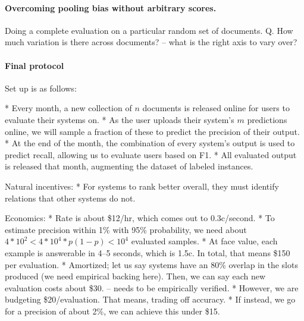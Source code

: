 \paragraph{Overcoming pooling bias without arbitrary scores.}

Doing a complete evaluation on a particular random set of documents.
Q. How much variation is there across documents? -- what is the right axis to vary over? 

\paragraph{Final protocol}

Set up is as follows:

* Every month, a new collection of $n$ documents is released online for users to evaluate their systems on.
* As the user uploads their system's $m$ predictions online, we will sample a fraction of these to predict the precision of their output.
* At the end of the month, the combination of every system's output is used to predict recall, allowing us to evaluate users based on F1.
* All evaluated output is released that month, augmenting the dataset of labeled instances.

Natural incentives:
* For systems to rank better overall, they must identify relations that other systems do not.

Economics:
  * Rate is about \$12/hr, which comes out to 0.3c/second.
  * To estimate precision within 1\% with 95\% probability, we need about $4*10^2 < 4 * 10^4 * p (1-p) < 10^4$ evaluated samples.
  * At face value, each example is answerable in 4--5 seconds, which is 1.5c. In total, that means \$150 per evaluation.
  * Amortized; let us say systems have an 80\% overlap in the slots produced (we need empirical backing here). Then, we can say each new evaluation costs about \$30. -- needs to be empirically verified.
  * However, we are budgeting \$20/evaluation. That means, trading off accuracy.
  * If instead, we go for a precision of about 2\%, we can achieve this under \$15.
